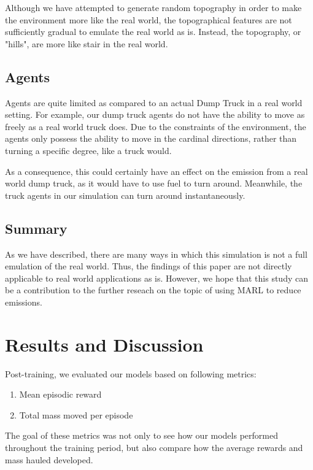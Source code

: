 \documentclass[conference]{IEEEtran}
\begin{document}
	Although we have attempted to generate random topography in order to make the environment more like
	the real world, the topographical features are not sufficiently gradual to emulate the real world as is.
	Instead, the topography, or "hills", are more like stair in the real world.


	\subsection{Agents}
	Agents are quite limited as compared to an actual Dump Truck in a real world setting. For example,
	our dump truck agents do not have the ability to move as freely as a real world truck does. Due to the
	constraints of the environment, the agents only possess the ability to move in the cardinal directions,
	rather than turning a specific degree, like a truck would.

	As a consequence, this could certainly have an effect on the emission from a real world dump truck, as
	it would have to use fuel to turn around. Meanwhile, the truck agents in our simulation can turn around
	instantaneously.


	\subsection{Summary}
	As we have described, there are many ways in which this simulation is not a full emulation of the
	real world. Thus, the findings of this paper are not directly applicable to real world applications
	as is. However, we hope that this study can be a contribution to the further reseach on the topic of
	using MARL to reduce emissions.


	\section{Results and Discussion}
	Post-training, we evaluated our models based on following metrics:

	\begin{enumerate}
		\item Mean episodic reward
		\item Total mass moved per episode
	\end{enumerate}

	The goal of these metrics was not only to see how our models performed throughout the training period, but also compare how the average rewards and mass hauled developed.
\end{document}
